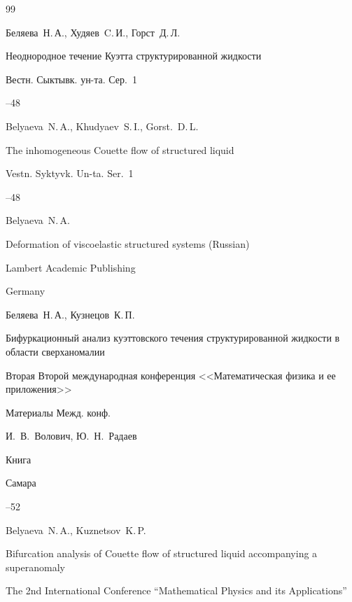\begin{thebibliography}{99}

\by Беляева~Н.\,А.,  Худяев~C.\,И., Горст~Д.\,Л.

\paper Неоднородное течение Куэтта структурированной жидкости

\jour Вестн. Сыктывк.  ун-та. Сер.~1



--48

\misctransl

\by Belyaeva~N.\,A., Khudyaev~S.\,I., Gorst.~D.\,L.

\paper The inhomogeneous Couette flow of structured liquid

\jour Vestn. Syktyvk. Un-ta. Ser.~1



--48




\by Belyaeva~N.\,A. 

\book Deformation of viscoelastic structured systems (Russian) 

\publ Lambert Academic Publishing  

\publaddr Germany 






\by Беляева~Н.\,А., Кузнецов~К.\,П.

\paper Бифуркационный анализ куэттовского течения структурированной жидкости в области сверханомалии

\inbook Вторая Второй международная конференция <<Математическая физика и ее приложения>>

\bookinfo Материалы Межд. конф.

\eds И.~В.~Волович, Ю.~Н.~Радаев

\publ Книга

\publaddr Самара


--52

\misctransl

\by Belyaeva~N.\,A., Kuznetsov~K.\,P.

\paper Bifurcation analysis of Couette flow of structured liquid accompanying a superanomaly

\inbook The 2nd International Conference ``Mathematical Physics and its Applications''


\end{thebibliography}
